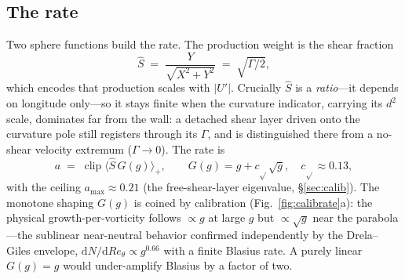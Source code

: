 \subsection{The rate}\label{sec:rate}
Two sphere functions build the rate. The production weight is the shear
fraction
\begin{equation}
  \hat S \;=\; \frac{Y}{\sqrt{X^2+Y^2}} \;=\; \sqrt{\Gamma/2},
  \label{eq:shat}
\end{equation}
which encodes that production scales with $|U'|$. Crucially $\hat S$ is a
\emph{ratio}---it depends on longitude only---so it stays finite when the
curvature indicator, carrying its $d^2$ scale, dominates far from the wall: a
detached shear layer driven onto the curvature pole still registers through its
$\Gamma$, and is distinguished there from a no-shear velocity extremum
($\Gamma\!\to\!0$). The rate is
\begin{equation}
  a \;=\; \operatorname{clip}\big\langle \hat S\,G(g)\big\rangle_{+},
  \qquad G(g) = g + c_{\!\sqrt{}}\sqrt{g},\quad c_{\!\sqrt{}}\!\approx\!0.13,
  \label{eq:rate}
\end{equation}
with the ceiling $a_{\max}\!\approx\!0.21$ (the free-shear-layer eigenvalue,
\S\ref{sec:calib}). The monotone shaping $G(g)$ is coined by calibration
(Fig.~\ref{fig:calibrate}a): the physical growth-per-vorticity follows
$\propto g$ at large $g$ but $\propto\!\sqrt{g}$ near the parabola---the
sublinear near-neutral behavior confirmed independently by the Drela--Giles
envelope, $\mathrm{d}N/\mathrm{d}Re_\theta\!\propto\!g^{0.66}$ with a finite
Blasius rate. A purely linear $G(g)=g$ would under-amplify Blasius by a factor
of two.

